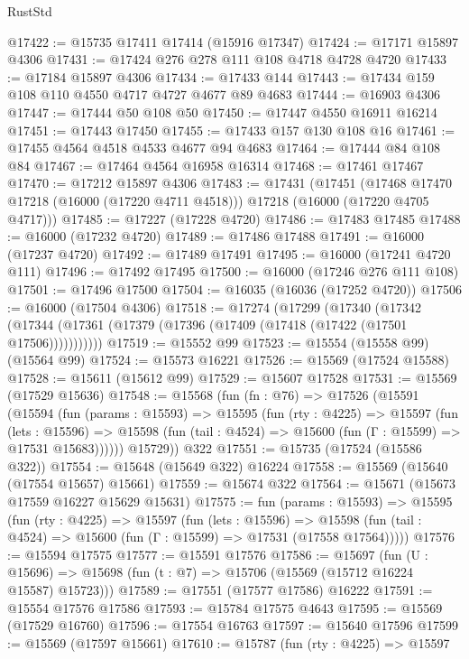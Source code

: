 \begin{lexlean}{RustStd}
\begin{coremodule}
{\begin{coremodule}
{{{{{{{{{{{{{{{{{{{{{{{{{{{{{{{{{{{{{{{{{{{{{{{{{{{{{{{{{{{{@17422 := @15735 @17411 @17414 (@15916 @17347)
@17424 := @17171 @15897 @4306
@17431 := @17424 @276 @278 @111 @108 @4718 @4728 @4720
@17433 := @17184 @15897 @4306
@17434 := @17433 @144
@17443 := @17434 @159 @108 @110 @4550 @4717 @4727 @4677 @89 @4683
@17444 := @16903 @4306
@17447 := @17444 @50 @108 @50
@17450 := @17447 @4550 @16911 @16214
@17451 := @17443 @17450
@17455 := @17433 @157 @130 @108 @16
@17461 := @17455 @4564 @4518 @4533 @4677 @94 @4683
@17464 := @17444 @84 @108 @84
@17467 := @17464 @4564 @16958 @16314
@17468 := @17461 @17467
@17470 := @17212 @15897 @4306
@17483 := @17431
    (@17451
      (@17468 @17470 @17218 (@16000 (@17220 @4711 @4518)))
      @17218
      (@16000 (@17220 @4705 @4717)))
@17485 := @17227 (@17228 @4720)
@17486 := @17483 @17485
@17488 := @16000 (@17232 @4720)
@17489 := @17486 @17488
@17491 := @16000 (@17237 @4720)
@17492 := @17489 @17491
@17495 := @16000 (@17241 @4720 @111)
@17496 := @17492 @17495
@17500 := @16000 (@17246 @276 @111 @108)
@17501 := @17496 @17500
@17504 := @16035 (@16036 (@17252 @4720))
@17506 := @16000 (@17504 @4306)
@17518 := @17274
    (@17299
      (@17340
        (@17342 (@17344 (@17361 (@17379 (@17396 (@17409 (@17418 (@17422 (@17501 @17506)))))))))))
@17519 := @15552 @99
@17523 := @15554 (@15558 @99) (@15564 @99)
@17524 := @15573 @16221
@17526 := @15569 (@17524 @15588)
@17528 := @15611 (@15612 @99)
@17529 := @15607 @17528
@17531 := @15569 (@17529 @15636)
@17548 := @15568
    (fun (fn : @76) =>
    @17526
      (@15591
        (@15594
          (fun (params : @15593) =>
          @15595
            (fun (rty : @4225) =>
            @15597
              (fun (lets : @15596) =>
              @15598 (fun (tail : @4524) => @15600 (fun (Γ : @15599) => @17531 @15683))))))
        @15729))
    @322
@17551 := @15735 (@17524 (@15586 @322))
@17554 := @15648 (@15649 @322) @16224
@17558 := @15569 (@15640 (@17554 @15657) @15661)
@17559 := @15674 @322
@17564 := @15671 (@15673 @17559 @16227 @15629 @15631)
@17575 := fun (params : @15593) =>
  @15595
    (fun (rty : @4225) =>
    @15597
      (fun (lets : @15596) =>
      @15598 (fun (tail : @4524) => @15600 (fun (Γ : @15599) => @17531 (@17558 @17564)))))
@17576 := @15594 @17575
@17577 := @15591 @17576
@17586 := @15697
    (fun (U : @15696) => @15698 (fun (t : @7) => @15706 (@15569 (@15712 @16224 @15587) @15723)))
@17589 := @17551 (@17577 @17586) @16222
@17591 := @15554 @17576 @17586
@17593 := @15784 @17575 @4643
@17595 := @15569 (@17529 @16760)
@17596 := @17554 @16763
@17597 := @15640 @17596
@17599 := @15569 (@17597 @15661)
@17610 := @15787
    (fun (rty : @4225) =>
    @15597
}}}}}}}}}}}}}}}}}}}}}}}}}}}}}}}}}}}}}}}}}}}}}}}}}}}}}}}}}}}}
\end{coremodule}}
\end{coremodule}
\end{lexlean}
